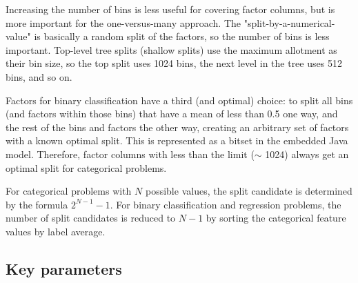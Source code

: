 Increasing the number of bins is less useful for covering factor columns, but is more important for the
one-versus-many approach. The "split-by-a-numerical-value" is basically a random split of the factors, so the
number of bins is less important. Top-level tree splits (shallow splits) use the maximum allotment as their bin size,
so the top split uses 1024 bins, the next level in the tree uses 512 bins, and so on.

Factors for binary classification have a third (and optimal) choice: to split all bins (and factors within those bins)
that have a mean of less than 0.5 one way, and the rest of the bins and factors the other way, creating an arbitrary
set of factors with a known optimal split. This is represented as a bitset in the embedded Java model. Therefore,
factor columns with less than the limit ($\mathtt{\sim}$ 1024) always get an optimal split for categorical problems.

For categorical problems with $N$ possible values, the split candidate is determined by the formula $2^{N-1}-1$.
For binary classification and regression problems, the number of split candidates is reduced to $N-1$ by sorting
the categorical feature values by label average.

\subsection{Key parameters}

